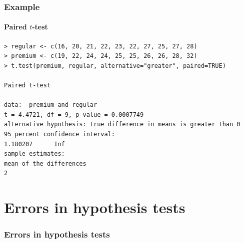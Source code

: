 \documentclass{beamer}
\begin{document}
\begin{frame}[fragile]
  \frametitle{Example}
\framesubtitle{Paired $t$-test}
  
\footnotesize
\begin{verbatim}
> regular <- c(16, 20, 21, 22, 23, 22, 27, 25, 27, 28)
> premium <- c(19, 22, 24, 24, 25, 25, 26, 26, 28, 32)
> t.test(premium, regular, alternative="greater", paired=TRUE)

Paired t-test

data:  premium and regular
t = 4.4721, df = 9, p-value = 0.0007749
alternative hypothesis: true difference in means is greater than 0
95 percent confidence interval:
1.180207      Inf
sample estimates:
mean of the differences 
2
\end{verbatim}
\end{frame}

\section{Errors in hypothesis tests}
\sectionframelogo{}

\begin{frame}
  \frametitle{Errors in hypothesis tests}

  \begin{table}
    \centering
  \end{table}
\end{frame}
\end{document}

